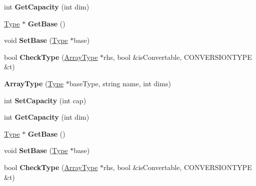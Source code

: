 \begin{DoxyCompactItemize}
\item 
\hypertarget{classArrayType_a97ce54630d5df790a8a706cb2f1c5751}{int {\bfseries Get\-Capacity} (int dim)}\label{classArrayType_a97ce54630d5df790a8a706cb2f1c5751}

\item 
\hypertarget{classArrayType_ac874b4e13dba44082d7eec7e057fd74c}{\hyperlink{classType}{Type} $\ast$ {\bfseries Get\-Base} ()}\label{classArrayType_ac874b4e13dba44082d7eec7e057fd74c}

\item 
\hypertarget{classArrayType_ae198281d73c175b70c41856ee9bcfbb9}{void {\bfseries Set\-Base} (\hyperlink{classType}{Type} $\ast$base)}\label{classArrayType_ae198281d73c175b70c41856ee9bcfbb9}

\item 
\hypertarget{classArrayType_ad20dee813ec90843a6333e5823e0128a}{bool {\bfseries Check\-Type} (\hyperlink{classArrayType}{Array\-Type} $\ast$rhs, bool \&is\-Convertable, C\-O\-N\-V\-E\-R\-S\-I\-O\-N\-T\-Y\-P\-E \&t)}\label{classArrayType_ad20dee813ec90843a6333e5823e0128a}

\item 
\hypertarget{classArrayType_a90aea374946e0e5cf4b89fc039969f82}{{\bfseries Array\-Type} (\hyperlink{classType}{Type} $\ast$base\-Type, string name, int dims)}\label{classArrayType_a90aea374946e0e5cf4b89fc039969f82}

\item 
\hypertarget{classArrayType_acff47fdbadc911bcb3236dcb9e8dd0a4}{int {\bfseries Set\-Capacity} (int cap)}\label{classArrayType_acff47fdbadc911bcb3236dcb9e8dd0a4}

\item 
\hypertarget{classArrayType_a97ce54630d5df790a8a706cb2f1c5751}{int {\bfseries Get\-Capacity} (int dim)}\label{classArrayType_a97ce54630d5df790a8a706cb2f1c5751}

\item 
\hypertarget{classArrayType_ac874b4e13dba44082d7eec7e057fd74c}{\hyperlink{classType}{Type} $\ast$ {\bfseries Get\-Base} ()}\label{classArrayType_ac874b4e13dba44082d7eec7e057fd74c}

\item 
\hypertarget{classArrayType_ae198281d73c175b70c41856ee9bcfbb9}{void {\bfseries Set\-Base} (\hyperlink{classType}{Type} $\ast$base)}\label{classArrayType_ae198281d73c175b70c41856ee9bcfbb9}

\item 
\hypertarget{classArrayType_ad20dee813ec90843a6333e5823e0128a}{bool {\bfseries Check\-Type} (\hyperlink{classArrayType}{Array\-Type} $\ast$rhs, bool \&is\-Convertable, C\-O\-N\-V\-E\-R\-S\-I\-O\-N\-T\-Y\-P\-E \&t)}\label{classArrayType_ad20dee813ec90843a6333e5823e0128a}


\end{DoxyCompactItemize}
